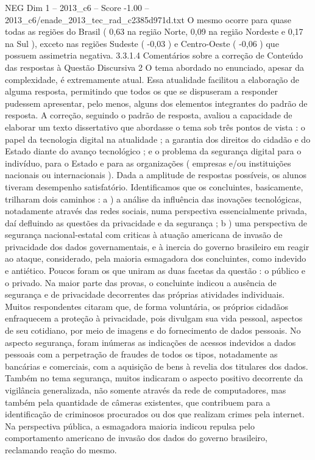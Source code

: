 \begin{textsample}{NEG Dim 1 – 2013\_c6 – Score -1.00 – 2013\_c6/enade\_2013\_tec\_rad\_c2385d971d.txt}
O mesmo ocorre para quase todas as regiões do Brasil ( 0,63 na região Norte, 0,09 na região Nordeste e 0,17 na Sul ), exceto nas regiões Sudeste ( -0,03 ) e Centro-Oeste ( -0,06 ) que possuem assimetria negativa. 3.3.1.4 Comentários sobre a correção de Conteúdo das respostas à Questão Discursiva 2 O tema abordado no enunciado, apesar da complexidade, é extremamente atual.
Essa atualidade facilitou a elaboração de alguma resposta, permitindo que todos os que se dispuseram a responder pudessem apresentar, pelo menos, alguns dos elementos integrantes do padrão de resposta.
A correção, seguindo o padrão de resposta, avaliou a capacidade de elaborar um texto dissertativo que abordasse o tema sob três pontos de vista : o papel da tecnologia digital na atualidade ; a garantia dos direitos do cidadão e do Estado diante do avanço tecnológico ; e o problema da segurança digital para o indivíduo, para o Estado e para as organizações ( empresas e/ou instituições nacionais ou internacionais ).
Dada a amplitude de respostas possíveis, os alunos tiveram desempenho satisfatório.
Identificamos que os concluintes, basicamente, trilharam dois caminhos : a ) a análise da influência das inovações tecnológicas, notadamente através das redes sociais, numa perspectiva essencialmente privada, daí defluindo as questões da privacidade e da segurança ; b ) uma perspectiva de segurança nacional-estatal com criticas à atuação americana de invasão de privacidade dos dados governamentais, e à inercia do governo brasileiro em reagir ao ataque, considerado, pela maioria esmagadora dos concluintes, como indevido e antiético.
Poucos foram os que uniram as duas facetas da questão : o público e o privado.
Na maior parte das provas, o concluinte indicou a ausência de segurança e de privacidade decorrentes das próprias atividades individuais.
Muitos respondentes citaram que, de forma voluntária, os próprios cidadãos enfraquecem a proteção à privacidade, pois divulgam sua vida pessoal, aspectos de seu cotidiano, por meio de imagens e do fornecimento de dados pessoais.
No aspecto segurança, foram inúmeras as indicações de acessos indevidos a dados pessoais com a perpetração de fraudes de todos os tipos, notadamente as bancárias e comerciais, com a aquisição de bens à revelia dos titulares dos dados.
Também no tema segurança, muitos indicaram o aspecto positivo decorrente da vigilância generalizada, não somente através da rede de computadores, mas também pela quantidade de câmeras existentes, que contribuem para a identificação de criminosos procurados ou dos que realizam crimes pela internet.
Na perspectiva pública, a esmagadora maioria indicou repulsa pelo comportamento americano de invasão dos dados do governo brasileiro, reclamando reação do mesmo.

\end{textsample}
